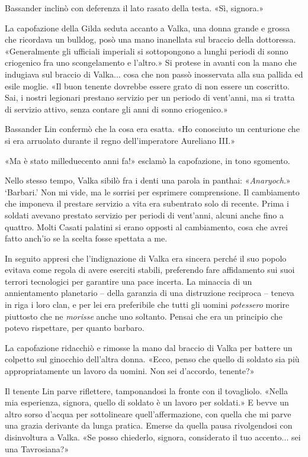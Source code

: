 Bassander inclinò con deferenza il lato rasato della testa. «Sì,
signora.»

La capofazione della Gilda seduta accanto a Valka, una donna grande e
grossa che ricordava un bulldog, posò una mano inanellata sul braccio
della dottoressa. «Generalmente gli ufficiali imperiali si sottopongono
a lunghi periodi di sonno criogenico fra uno scongelamento e l'altro.»
Si protese in avanti con la mano che indugiava sul braccio di Valka...
cosa che non passò inosservata alla sua pallida ed esile moglie. «Il
buon tenente dovrebbe essere grato di non essere un coscritto. Sai, i
nostri legionari prestano servizio per un periodo di vent'anni, ma si
tratta di servizio attivo, senza contare gli anni di sonno criogenico.»

Bassander Lin confermò che la cosa era esatta. «Ho conosciuto un
centurione che si era arruolato durante il regno dell'imperatore
Aureliano III.»

«Ma è stato milleduecento anni fa!» esclamò la capofazione, in tono
sgomento.

Nello stesso tempo, Valka sibilò fra i denti una parola in panthai:
«\emph{Anaryoch}.» `Barbari.' Non mi vide, ma le sorrisi per esprimere
comprensione. Il cambiamento che imponeva il prestare servizio a vita
era subentrato solo di recente. Prima i soldati avevano prestato
servizio per periodi di vent'anni, alcuni anche fino a quattro. Molti
Casati palatini si erano opposti al cambiamento, cosa che avrei fatto
anch'io se la scelta fosse spettata a me.

In seguito appresi che l'indignazione di Valka era sincera perché il suo
popolo evitava come regola di avere eserciti stabili, preferendo fare
affidamento sui suoi terrori tecnologici per garantire una pace incerta.
La minaccia di un annientamento planetario -- della garanzia di una
distruzione reciproca -- teneva in riga i loro clan, e per lei era
preferibile che tutti gli uomini \emph{potessero} morire piuttosto che
ne \emph{morisse} anche uno soltanto. Pensai che era un principio che
potevo rispettare, per quanto barbaro.

La capofazione ridacchiò e rimosse la mano dal braccio di Valka per
battere un colpetto sul ginocchio dell'altra donna. «Ecco, penso che
quello di soldato sia più appropriatamente un lavoro da uomini. Non sei
d'accordo, tenente?»

Il tenente Lin parve riflettere, tamponandosi la fronte con il
tovagliolo. «Nella mia esperienza, signora, quello di soldato è un
lavoro per soldati.» E bevve un altro sorso d'acqua per sottolineare
quell'affermazione, con quella che mi parve una grazia derivante da
lunga pratica. Emerse da quella pausa rivolgendosi con disinvoltura a
Valka. «Se posso chiederlo, signora, considerato il tuo accento... sei
una Tavrosiana?»

